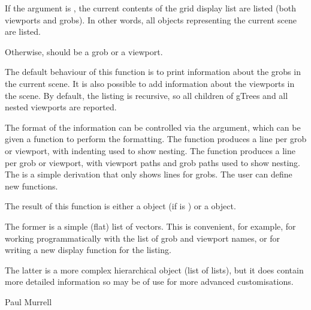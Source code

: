 %
\begin{Details}\relax
If the argument  is , the current contents
of the grid display list are listed (both viewports and grobs).
In other words, all objects representing the current scene
are listed.

Otherwise,  should be a grob or a viewport.

The default behaviour of this function is to print information
about the grobs in the current scene.  It is also possible to
add information about the viewports in the scene.  By default,
the listing is recursive, so all children of gTrees and all
nested viewports are reported.

The format of the information can be controlled via the 
argument, which can be given a function to perform the formatting.
The  function produces a line per grob or
viewport, with indenting used to show nesting.  The 
function produces a line per grob or viewport, with viewport paths
and grob paths used to show nesting.  The 
is a simple derivation that only shows lines for grobs.  The user
can define new functions.
\end{Details}
%
\begin{Value}
The result of this function is either a 
object (if  is ) or a 
object.

The former is a simple (flat) list of vectors.  This is convenient,
for example,
for working programmatically with the list of grob and viewport
names, or for writing a new display function for the listing.

The latter is a more complex hierarchical object (list of lists),
but it does contain more detailed information so may be of use for
more advanced customisations.
\end{Value}
%
\begin{Author}\relax
 Paul Murrell 
\end{Author}
%
\begin{SeeAlso}\relax
{}
\end{SeeAlso}
%
